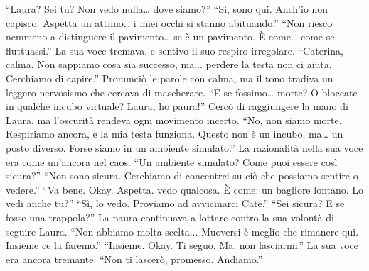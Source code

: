 \begin{dialogue}
 \enquote{Laura? Sei tu? Non vedo nulla… dove siamo?}
 \enquote{Sì, sono qui. Anch'io non capisco. Aspetta un attimo… i miei occhi si stanno abituando.}
 \enquote{Non riesco nemmeno a distinguere il pavimento… se è un pavimento. È come… come se fluttuassi.} La sua voce tremava, e sentivo il suo respiro irregolare.
 \enquote{Caterina, calma. Non sappiamo cosa sia successo, ma... perdere la testa non ci aiuta. Cerchiamo di capire.} Pronunciò le parole con calma, ma il tono tradiva un leggero nervosismo che cercava di mascherare.
 \enquote{E se fossimo… morte? O bloccate in qualche incubo virtuale? Laura, ho paura!} Cercò di raggiungere la mano di Laura, ma l’oscurità rendeva ogni movimento incerto.
 \enquote{No, non siamo morte. Respiriamo ancora, e la mia testa funziona. Questo non è un incubo, ma… un posto diverso. Forse siamo in un ambiente simulato.} La razionalità nella sua voce era come un’ancora nel caos.
 \enquote{Un ambiente simulato? Come puoi essere così sicura?}
 \enquote{Non sono sicura. Cerchiamo di concentrci su ciò che possiamo sentire o vedere.}
 \enquote{Va bene. Okay. Aspetta. vedo qualcosa. È come: un bagliore lontano. Lo vedi anche tu?}
 \enquote{Sì, lo vedo. Proviamo ad avvicinarci Cate.}
 \enquote{Sei sicura? E se fosse una trappola?} La paura continuava a lottare contro la sua volontà di seguire Laura.
 \enquote{Non abbiamo molta scelta... Muoversi è meglio che rimanere qui. Insieme ce la faremo.}
 \enquote{Insieme. Okay. Ti seguo. Ma, non lasciarmi.} La sua voce era ancora tremante.
 \enquote{Non ti lascerò, promesso. Andiamo.}
\end{dialogue}


